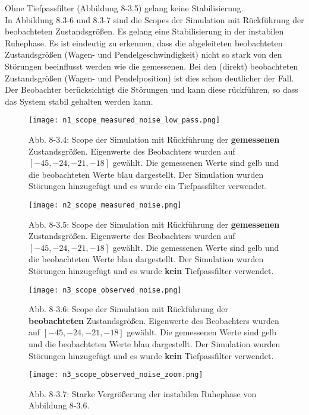 \documentclass[11pt]{scrartcl} %
\begin{document}
Ohne Tiefpassfilter (Abbildung 8-3.5) gelang keine Stabilisierung.\\

In Abbildung 8.3-6 und 8.3-7 sind die Scopes der Simulation mit Rückführung der beobachteten Zustandsgrößen. Es gelang eine Stabilisierung in der instabilen Ruhephase. Es ist eindeutig zu erkennen, dass die abgeleiteten beobachteten Zustandsgrößen (Wagen- und Pendelgeschwindigkeit) nicht so stark von den Störungen beeinflusst werden wie die gemessenen. Bei den (direkt) beobachteten Zustandsgrößen (Wagen- und Pendelposition) ist dies schon deutlicher der Fall. Der Beobachter berücksichtigt die Störungen und kann diese rückführen, so dass das System stabil gehalten werden kann.


\begin{figure}[H]
\centering
\texttt{[image: n1\_scope\_measured\_noise\_low\_pass.png]}
\captionsetup{labelformat=empty}
\caption{Abb. 8-3.4: Scope der Simulation mit Rückführung der \textbf{gemessenen} Zustandsgrößen. Eigenwerte des Beobachters wurden auf $\left[-45, -24, -21, -18\right]$ gewählt. Die gemessenen Werte sind gelb und die beobachteten Werte blau dargestellt. Der Simulation wurden Störungen hinzugefügt und es wurde ein Tiefpassfilter verwendet.}
\end{figure}
\begin{figure}[H]
\centering
\texttt{[image: n2\_scope\_measured\_noise.png]}
\captionsetup{labelformat=empty}
\caption{Abb. 8-3.5: Scope der Simulation mit Rückführung der \textbf{gemessenen} Zustandsgrößen. Eigenwerte des Beobachters wurden auf $\left[-45, -24, -21, -18\right]$ gewählt. Die gemessenen Werte sind gelb und die beobachteten Werte blau dargestellt. Der Simulation wurden Störungen hinzugefügt und es wurde \textbf{kein} Tiefpassfilter verwendet.}
\end{figure}
\begin{figure}[H]
\centering
\texttt{[image: n3\_scope\_observed\_noise.png]}
\captionsetup{labelformat=empty}
\caption{Abb. 8-3.6: Scope der Simulation mit Rückführung der \textbf{beobachteten} Zustandsgrößen. Eigenwerte des Beobachters wurden auf $\left[-45, -24, -21, -18\right]$ gewählt. Die gemessenen Werte sind gelb und die beobachteten Werte blau dargestellt. Der Simulation wurden Störungen hinzugefügt und es wurde \textbf{kein} Tiefpassfilter verwendet.}
\end{figure}
\begin{figure}[H]
\centering
\texttt{[image: n3\_scope\_observed\_noise\_zoom.png]}
\captionsetup{labelformat=empty}
\caption{Abb. 8-3.7: Starke Vergrößerung der instabilen Ruhephase von Abbildung 8-3.6.}
\end{figure}
\end{document}
